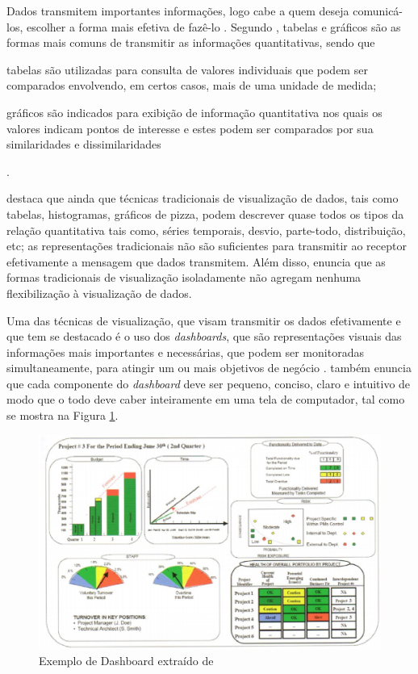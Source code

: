 Dados transmitem importantes informações, logo cabe a quem deseja comunicá-los, escolher a forma mais efetiva de fazê-lo \cite{raquel2013}. Segundo , tabelas e gráficos são as formas mais comuns de transmitir as informações quantitativas, sendo que\begin{inparaenum}[i)]
\item tabelas são utilizadas para consulta de valores individuais que podem ser comparados envolvendo, em certos casos, mais de uma unidade de medida;
\item gráficos são indicados para exibição de informação quantitativa nos quais os valores indicam pontos de interesse e estes podem ser comparados por sua similaridades e dissimilaridades\end{inparaenum}. 


 destaca que ainda que técnicas tradicionais de visualização de dados, tais como tabelas, histogramas, gráficos de pizza, podem descrever quase todos os tipos da relação quantitativa tais como, séries temporais, desvio, parte-todo, distribuição, etc; as representações tradicionais não são suficientes para transmitir ao receptor efetivamente a mensagem que dados transmitem. Além disso,  enuncia que as formas tradicionais de visualização isoladamente não agregam nenhuma flexibilização à visualização de dados.


Uma das técnicas de visualização, que visam transmitir os dados efetivamente e que tem se destacado é o uso dos \textit{dashboards}, que são representações visuais das informações mais importantes e necessárias, que podem ser monitoradas simultaneamente, para atingir um ou mais objetivos de negócio \cite{raquel2013}.  também enuncia que cada componente do \textit{dashboard} deve ser pequeno, conciso, claro e intuitivo de modo que o todo deve caber inteiramente em uma tela de computador, tal como se mostra na Figura \ref{dashboard}.



\begin{figure}[ht!]
\centering
	\includegraphics[keepaspectratio=true, scale=0.8]{figuras/dashboard1.eps}
	\caption{Exemplo de Dashboard extraído de 
	}
	\label{dashboard}
\end{figure}
\FloatBarrier







